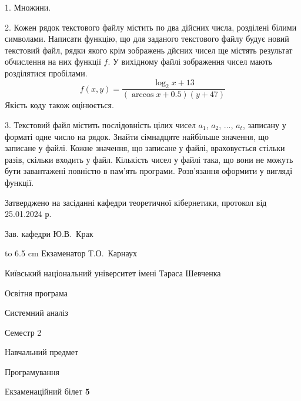\documentclass[12pt, ukrainian]{article}
\begin{document}
{%
1. Множини.%
\par
\vspace{2mm}

2. Кожен рядок текстового файлу містить по два дійсних числа, розділені білими символами.
Написати функцію, що для заданого текстового файлу будує новий текстовий файл, рядки якого крім зображень дйсних чисел ще містять результат обчислення на них функції $f$. У вихідному файлі зображення чисел мають розділятися пробілами. 
$$f(x, y) =\frac{\log_{2} x + 13}{(\arccos x + 0.5) (y + 47)}$$ 
Якість коду також оцінюється.

\par
\vspace{2mm}

3. Текстовий файл містить послідовність цілих чисел $a_1$, $a_2$, $\ldots$, $a_t$, записану у форматі одне число на рядок. Знайти сімнадцяте найбільше значення, що записане у файлі. Кожне значення, що записане у файлі, враховується стільки разів, скільки входить у файл. Кількість чисел у файлі така, що вони не можуть бути завантажені повністю в пам'ять програми. Розв'язання оформити у вигляді функції.

}
{\smallskip\smallskip \begin {scriptsize} Затверджено на засіданні кафедри теоретичної кібернетики, протокол   від   25.01.2024 р.\par\smallskip\smallskip\smallskip\smallskip
{\parbox {6.5 cm} {Зав. кафедри \dotfill Ю.В.~Крак}}\hspace {0.7cm} {\hbox to 6.5 cm { Екзаменатор \dotfill Т.О.~Карнаух}} \end{scriptsize}}
\newpage
{{\begin {scriptsize}\par
{ \center  Київський національний університет імені Тараса Шевченка \par}
{\parbox {5 cm}{Освітня програма \hfill}{\parbox {7 cm}{Системний аналіз\hfill}}\parbox {6 cm}{\hfill Семестр 2}}\par
{\parbox {5 cm} {Навчальний предмет \hfill}\parbox {7 cm}{Програмування \hfill}\parbox {6cm}{\hfill}\par}\vspace{-15pt} \end{scriptsize}}{\center Екзаменаційний білет \No \textbf { 5 }\par}}
\end{document}
